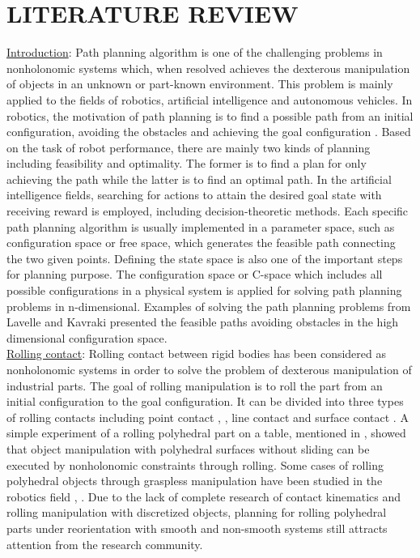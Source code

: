
\section{LITERATURE REVIEW}
\noindent \uline{Introduction}:
Path planning algorithm is one of the challenging problems in nonholonomic systems which, when resolved achieves the dexterous manipulation of objects in an unknown or part-known environment. 
This problem is mainly applied to the fields of robotics, artificial intelligence and autonomous vehicles. 
In robotics, the motivation of path planning is to find a possible path from an initial configuration, avoiding the obstacles and achieving the goal configuration \cite{Zhang2018_PP_mobileRobot}. 
Based on the task of robot performance, there are mainly two kinds of planning including feasibility and optimality. 
The former is to find a plan for only achieving the path while the latter is to find an optimal path. 
In the artificial intelligence fields, searching for actions to attain the desired goal state with receiving reward is employed, including decision-theoretic methods. 
Each specific path planning algorithm is usually implemented in a parameter space, such as configuration space or free space, which generates the feasible path connecting the two given points. 
Defining the state space is also one of the important steps for planning purpose. The configuration space or C-space which includes all possible configurations in a physical system is applied for solving path planning problems in n-dimensional. 
Examples of solving the path planning problems from Lavelle \cite{LaValle06_PlanningAlgorithm} and Kavraki \cite{Kavraki96_PRM_HighDimensionSPace} presented the feasible paths avoiding obstacles in the high dimensional configuration space. \\

\noindent \uline{Rolling contact}:
Rolling contact between rigid bodies has been considered as nonholonomic systems in order to solve the problem of dexterous manipulation of industrial parts. 
The goal of rolling manipulation is to roll the part from an initial configuration to the goal configuration. 
It can be divided into three types of rolling contacts including point contact \cite{Cai86_PlanarMotion_PointContact}, \cite{Cai87_SpatialMotion_PointContact}, line contact \cite{Cai88_SpatialMotion_LineContact} and surface contact \cite{Borisov08_ChaplypinBall_FixSphere}. 
A simple experiment of a rolling polyhedral part on a table, mentioned in \cite{Bicchi2004_Reachability_steering_Polyhedra}, showed that object manipulation with polyhedral surfaces without sliding can be executed by nonholonomic constraints through rolling. 
Some cases of rolling polyhedral objects through graspless manipulation have been studied in the robotics field \cite{Aiyama93_Pivoting}, \cite{Erdmann91_polyhedronRolling_on_table}. 
Due to the lack of complete research of contact kinematics and rolling manipulation with discretized objects, planning for rolling polyhedral parts under reorientation with smooth and non-smooth systems still attracts attention from the research community.\\

